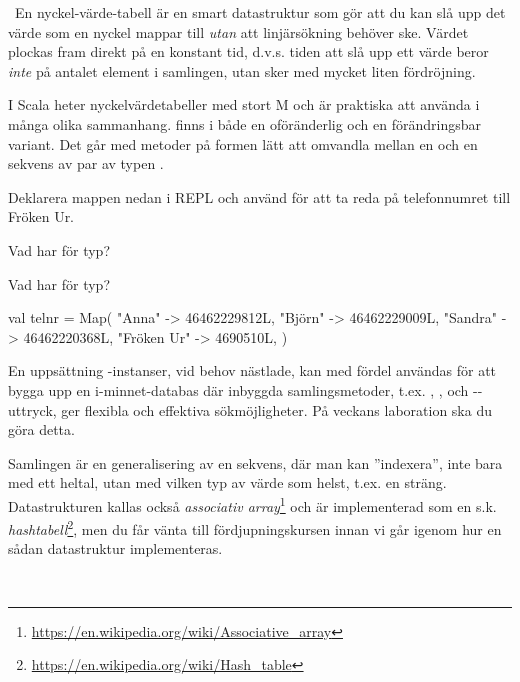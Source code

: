 \QUESTEND




\QUESTBEGIN

\Task \what~En nyckel-värde-tabell är en smart datastruktur som gör att du kan slå upp det värde som en nyckel mappar till \emph{utan} att linjärsökning behöver ske. Värdet plockas fram direkt på en konstant tid, d.v.s. tiden att slå upp ett värde beror \emph{inte} på antalet element i samlingen, utan sker med mycket liten fördröjning.

I Scala heter nyckelvärdetabeller  med stort M och är praktiska att använda i många olika sammanhang.  finns i både en oföränderlig och en förändringsbar variant. Det går med metoder på formen  lätt att omvandla mellan en  och en sekvens av par av typen .

\Subtask Deklarera mappen  nedan i REPL och använd  för att ta reda på telefonnumret till Fröken Ur.

\Subtask Vad har  för typ?

\Subtask Vad har  för typ?

\begin{Code}
val telnr = Map(
  "Anna"     -> 46462229812L,
  "Björn"     -> 46462229009L,
  "Sandra"    -> 46462220368L,
  "Fröken Ur" -> 4690510L,
)
\end{Code}
En uppsättning -instanser, vid behov nästlade, kan med fördel användas för att bygga upp en i-minnet-databas där inbyggda samlingsmetoder, t.ex. , , och --uttryck, ger flexibla och effektiva sökmöjligheter. På veckans laboration ska du göra detta.

Samlingen  är en generalisering av en sekvens, där man kan ''indexera'', inte bara med ett heltal, utan med vilken typ av värde som helst, t.ex. en sträng. Datastrukturen  kallas också \emph{associativ array}\footnote{\href{https://en.wikipedia.org/wiki/Associative_array}{https://en.wikipedia.org/wiki/Associative\_array}} och är implementerad som en s.k. \emph{hashtabell}\footnote{\href{https://en.wikipedia.org/wiki/Hash_table}{https://en.wikipedia.org/wiki/Hash\_table}}, men du får vänta till fördjupningskursen innan vi går igenom hur en sådan datastruktur implementeras.

\SOLUTION

\TaskSolved \what~

